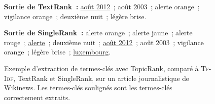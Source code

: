 \begin{figure}
{{      \textbf{Sortie de TextRank~:} \underline{août 2012}~; août 2003~; alerte
      orange~; vigilance orange~; deuxième nuit~; légère brise.

      \textbf{Sortie de SingleRank~:} alerte orange~; alerte jaune~; alerte
      rouge~; \underline{alerte}~; deuxième nuit~; \underline{août 2012}~; août
      2003~; vigilance orange~; légère brise~; \underline{luxembourg}.
    }
  }

  \caption[
    Exemple d'extraction de termes-clés avec TopicRank, comparé à
    \textsc{Tf-Idf}, TextRank et SingleRank, sur un article
    journalistique de Wikinews
  ]{
    Exemple d'extraction de termes-clés avec TopicRank, comparé à
    \textsc{Tf-Idf}, TextRank et SingleRank, sur un article
    journalistique de Wikinews. Les termes-clés soulignés sont les
    termes-clés correctement extraits.
    \label{fig:exemple_topicrank}
  }
\end{figure}

